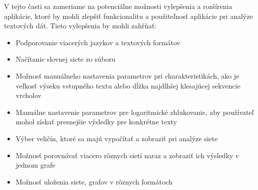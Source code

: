 V tejto časti sa zameriame na potenciálne možnosti vylepšenia a rozšírenia aplikácie, ktoré by mohli zlepšiť funkcionalitu
a použiteľnosť aplikácie pri analýze textových dát. Tieto vylepšenia by mohli zahŕňať:
\begin{itemize}
    \item Podporovanie viacerých jazykov a textových formátov
    \item Načítanie slovnej siete zo súboru
    \item Možnosť manuálneho nastavenia parametrov pri charakteristikách, ako je veľkosť výseku vstupného textu alebo dĺžka najdlhšej
    klesajúcej sekvencie vrcholov
    \item Manuálne nastavenie parametrov pre logaritmické zhlukovanie, aby používateľ mohol získať presnejšie
    výsledky pre konkrétne texty
    \item Výber veličín, ktoré sa majú vypočítať a zobraziť pri analýze siete
    \item Možnosť porovnávať viacero rôznych sietí naraz a zobraziť ich výsledky v jednom grafe
    \item Možnosť uloženia siete, grafov v rôznych formátoch

\end{itemize}